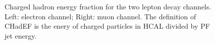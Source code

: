 \documentclass[12pt]{article} %
\begin{document}
\begin{figure}[H] %
  \caption{Charged hadron energy fraction for the two lepton decay channels. Left: electron channel; Right: muon channel. The definition of CHadEF is the enery of charged particles in HCAL divided by PF jet energy.}
  \label{fig:CHadEF}
\end{figure}
\end{document}
